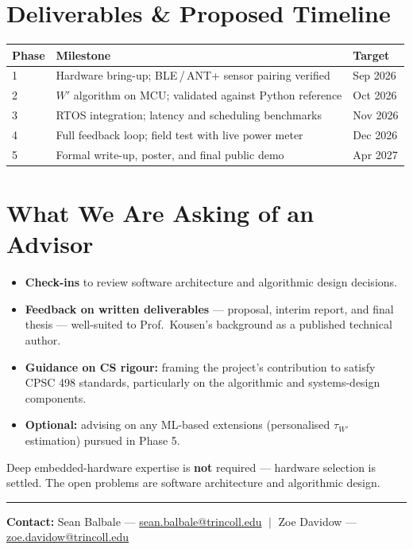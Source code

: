 \documentclass[11pt, letterpaper]{article}
\begin{document}
\section{Deliverables \& Proposed Timeline}

\begin{center}
  \begin{tabular}{lll}
    \toprule
    \textbf{Phase} & \textbf{Milestone} & \textbf{Target} \\
    \midrule
    1 & Hardware bring-up; BLE\,/\,ANT+ sensor pairing verified & Sep 2026 \\
    2 & $W'$ algorithm on MCU; validated against Python reference & Oct 2026 \\
    3 & RTOS integration; latency and scheduling benchmarks & Nov 2026 \\
    4 & Full feedback loop; field test with live power meter & Dec 2026 \\
    5 & Formal write-up, poster, and final public demo & Apr 2027 \\
    \bottomrule
  \end{tabular}
\end{center}

\section{What We Are Asking of an Advisor}

\begin{itemize}
  \item \textbf{Check-ins} to review software architecture and algorithmic
    design decisions.
  \item \textbf{Feedback on written deliverables} --- proposal, interim report, and
    final thesis --- well-suited to Prof.\ Kousen's background as a published
    technical author.
  \item \textbf{Guidance on CS rigour:} framing the project's contribution to satisfy
    CPSC 498 standards, particularly on the algorithmic and systems-design components.
  \item \textbf{Optional:} advising on any ML-based extensions (personalised
    $\tau_{W'}$ estimation) pursued in Phase 5.
\end{itemize}

Deep embedded-hardware expertise is \textbf{not} required --- hardware selection is
settled.  The open problems are software architecture and algorithmic design.

\vspace{1em}
\noindent\rule{\linewidth}{0.5pt}
\vspace{0.2em}
{\small
  \noindent \textbf{Contact:}\;
  Sean Balbale ---
  \href{mailto:sean.balbale@trincoll.edu}{sean.balbale@trincoll.edu}
  $\;\big|\;$
  Zoe Davidow ---
  \href{mailto:zoe.davidow@trincoll.edu}{zoe.davidow@trincoll.edu}
}
\end{document}

